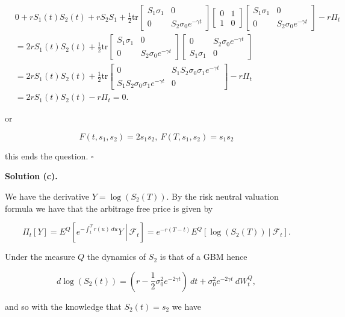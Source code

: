 \documentclass[
]{article}
\begin{document}
\begin{align*}
&0+rS_1(t)S_2(t)+rS_2S_1+\frac{1}{2}\text{tr}
\begin{bmatrix}
S_1\sigma_1 & 0\\
0 & S_2\sigma_0 e^{-\gamma t}
\end{bmatrix}
\begin{bmatrix}
0 & 1\\
1 & 0 
\end{bmatrix}
\begin{bmatrix}
S_1\sigma_1 & 0\\
0 & S_2\sigma_0 e^{-\gamma t}
\end{bmatrix} -r\Pi_t\\
&=2rS_1(t)S_2(t)+\frac{1}{2}\text{tr}
\begin{bmatrix}
S_1\sigma_1 & 0\\
0 & S_2\sigma_0 e^{-\gamma t}
\end{bmatrix}
\begin{bmatrix}
0 & S_2\sigma_0 e^{-\gamma t}\\
S_1\sigma_1 & 0
\end{bmatrix}\\
&=2rS_1(t)S_2(t)+\frac{1}{2}\text{tr}
\begin{bmatrix}
0 & S_1S_2\sigma_0\sigma_1e^{-\gamma t}\\
S_1S_2\sigma_0\sigma_1e^{-\gamma t} & 0
\end{bmatrix}-r\Pi_t\\
&=2rS_1(t)S_2(t)-r\Pi_t=0.
\end{align*}

or

\[
F(t,s_1,s_2)=2s_1s_2,\ F(T,s_1,s_2)=s_1s_2
\]

this ends the question. \(\square\)

\textbf{Solution (c).}

We have the derivative \(Y=\log(S_2(T))\). By the risk neutral valuation
formula we have that the arbitrage free price is given by

\[
\Pi_t[Y]=E^Q\left[\left.e^{-\int_t^Tr(u)\ du}Y\ \right\vert\ \mathcal{F}_t\right]=e^{-r(T-t)}E^Q\left[\left.\log(S_2(T))\ \right\vert\ \mathcal{F}_t\right].
\]

Under the measure \(Q\) the dynamics of \(S_2\) is that of a GBM hence

\[
d\log(S_2(t))=\left(r-\frac{1}{2}\sigma_0^2e^{-2\gamma t}\right)\ dt+\sigma_0^2e^{-2\gamma t}\ dW^Q_t,
\]

and so with the knowledge that \(S_2(t)=s_2\) we have
\end{document}
